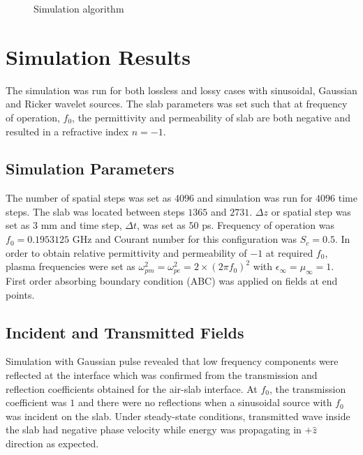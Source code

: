 \begin{figure}[htbp]
\caption{Simulation algorithm}
\label{1D-DNG-Algorithm}
\end{figure}
\section{Simulation Results}
The simulation was run for both lossless and lossy cases with sinusoidal, Gaussian and Ricker wavelet sources. The slab parameters was set such that at frequency of operation, $f_0$, the permittivity and permeability of slab are both negative and resulted in a refractive index $n=-1$.
\subsection{Simulation Parameters}
The number of spatial steps was set as $4096$ and simulation was run for $4096$ time steps. The slab was located between steps $1365$ and $2731$. $\Delta z$ or spatial step was set as $3$ mm and time step, $\Delta t$, was set as $50$ ps. Frequency of operation was $f_0=0.1953125$ GHz and Courant number for this configuration was $S_c=0.5$. In order to obtain relative permittivity and permeability of $-1$ at required $f_0$, plasma frequencies were set as $\omega^2_{pm}=\omega^2_{pe}=2\times(2\pi f_0)^2$ with $\epsilon_\infty=\mu_\infty=1$. First order absorbing boundary condition (ABC) was applied on fields at end points.
\subsection{Incident and Transmitted Fields}
Simulation with Gaussian pulse revealed that low frequency components were reflected at the interface which was confirmed from the transmission and reflection coefficients obtained for the air-slab interface. At $f_0$, the transmission coefficient was $1$ and there were no reflections when a sinusoidal source with $f_0$ was incident on the slab. Under steady-state conditions, transmitted wave inside the slab had negative phase velocity while energy was propagating in $+\hat{z}$ direction as expected.
